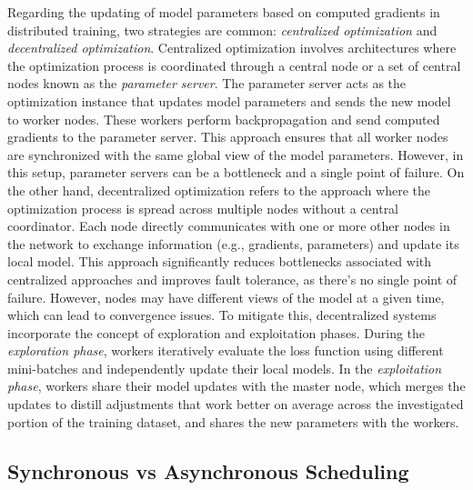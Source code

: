 \documentclass[11pt]{article}
\begin{document}
Regarding the updating of model parameters based on computed gradients in distributed training, two strategies are common: \textit{centralized optimization} and \textit{decentralized optimization}. Centralized optimization involves architectures where the optimization process is coordinated through a central node or a set of central nodes known as the \textit{parameter server}. The parameter server acts as the optimization instance that updates model parameters and sends the new model to worker nodes. These workers perform backpropagation and send computed gradients to the parameter server. This approach ensures that all worker nodes are synchronized with the same global view of the model parameters. However, in this setup, parameter servers can be a bottleneck and a single point of failure. On the other hand, decentralized optimization refers to the approach where the optimization process is spread across multiple nodes without a central coordinator. Each node directly communicates with one or more other nodes in the network to exchange information (e.g., gradients, parameters) and update its local model. This approach significantly reduces bottlenecks associated with centralized approaches and improves fault tolerance, as there’s no single point of failure. However, nodes may have different views of the model at a given time, which can lead to convergence issues. To mitigate this, decentralized systems incorporate the concept of exploration and exploitation phases. During the \textit{exploration phase}, workers iteratively evaluate the loss function using different mini-batches and independently update their local models. In the \textit{exploitation phase}, workers share their model updates with the master node, which merges the updates to distill adjustments that work better on average across the investigated portion of the training dataset, and shares the new parameters with the workers.

\subsection*{Synchronous vs Asynchronous Scheduling}
\end{document}
